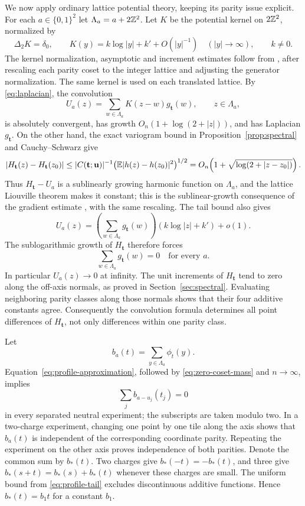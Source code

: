 We now apply ordinary lattice potential theory, keeping its parity
issue explicit.  For each $a\in\{0,1\}^2$ let
$\Lambda_a=a+2\mathbb Z^2$.  Let $K$ be the potential kernel on $2\mathbb Z^2$,
normalized by
\[
 \Delta_2K=\delta_0,\qquad
 K(y)=k\log|y|+k'+O(|y|^{-1})\quad (|y|\longrightarrow\infty),
 \qquad k\ne0.
\]
The kernel normalization, asymptotic and increment estimates follow from
\cite[Proposition~4.4.2, Theorem~4.4.4 and Corollary~4.4.5]{LawlerLimic2010},
after rescaling each parity coset to the integer lattice and adjusting
the generator normalization.  The same kernel is used on each translated
lattice.  By
\eqref{eq:laplacian}, the convolution
\[
 U_a(z)=\sum_{w\in\Lambda_a}K(z-w)g_{\mathbf t}(w),
 \qquad z\in\Lambda_a,
\]
is absolutely convergent, has growth $O_n(1+\log(2+|z|))$, and has
Laplacian $g_{\mathbf t}$.  On the other hand, the exact variogram
bound in Proposition~\ref{prop:spectral} and Cauchy--Schwarz give
\[
 |H_{\mathbf t}(z)-H_{\mathbf t}(z_0)|
 \le |C(\mathbf t;\mathbf u)|^{-1}
       \bigl(\mathbb E|h(z)-h(z_0)|^2\bigr)^{1/2}
 =O_n\!\left(1+\sqrt{\log(2+|z-z_0|)}\right).
\]
Thus $H_{\mathbf t}-U_a$ is a sublinearly growing harmonic function
on $\Lambda_a$, and the lattice Liouville theorem makes it constant;
this is the sublinear-growth consequence of the gradient estimate
\cite[Theorem~6.3.8(a)]{LawlerLimic2010}, with the same rescaling.
The tail bound also gives
\[
 U_a(z)=
 \left(\sum_{w\in\Lambda_a}g_{\mathbf t}(w)\right)
                  (k\log|z|+k')+o(1).
\]
The sublogarithmic growth of $H_{\mathbf t}$ therefore forces
\begin{equation}\label{eq:zero-coset-mass}
 \sum_{w\in\Lambda_a}g_{\mathbf t}(w)=0
 \quad\text{for every }a.
\end{equation}
In particular $U_a(z)\to0$ at infinity.  The unit increments of
$H_{\mathbf t}$ tend to zero along the off-axis normals, as proved
in Section~\ref{sec:spectral}.  Evaluating neighboring parity classes
along those normals shows that their four additive constants agree.
Consequently the convolution formula determines all point differences
of $H_{\mathbf t}$, not only differences within one parity class.

Let
\[
 b_a(t)=\sum_{y\in\Lambda_a}\phi_t(y).
\]
Equation~\eqref{eq:profile-approximation}, followed by
\eqref{eq:zero-coset-mass} and $n\to\infty$, implies
\[
 \sum_j b_{a-u_j}(t_j)=0
\]
in every separated neutral experiment; the subscripts are taken modulo
two.  In a two-charge experiment, changing one point by one tile along
the axis shows that $b_a(t)$ is independent of the corresponding
coordinate parity.  Repeating the experiment on the other axis proves
independence of both parities.  Denote the common sum by $b_*(t)$.
Two charges give $b_*(-t)=-b_*(t)$, and three give
$b_*(s+t)=b_*(s)+b_*(t)$ whenever these charges are small.
The uniform bound from \eqref{eq:profile-tail} excludes discontinuous
additive functions.  Hence $b_*(t)=b_1t$ for a constant $b_1$.

